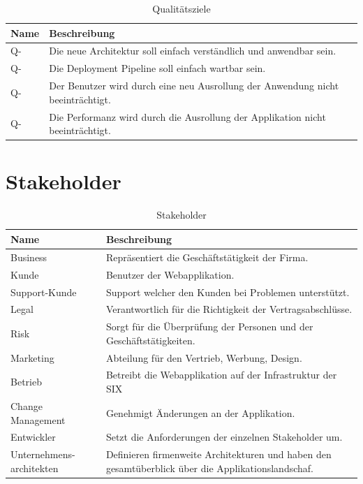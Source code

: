 \begin{table}[H]
	\centering
	\caption{Qualitätsziele}
	\begin{tabular}{ | p{3cm} | p{13cm} | }
		\toprule
		{\textbf{Name}} & {\textbf{Beschreibung}} \\
		\midrule
		Q-\arabic{quatar} \stepcounter{quatar} & Die neue Architektur soll einfach verständlich und anwendbar sein.\\ \hline
		Q-\arabic{quatar} \stepcounter{quatar} & Die Deployment Pipeline soll einfach wartbar sein. \\ \hline
		Q-\arabic{quatar} \stepcounter{quatar} & Der Benutzer wird durch eine neu Ausrollung der Anwendung nicht beeinträchtigt. \\ \hline
		Q-\arabic{quatar} \stepcounter{quatar} & Die Performanz wird durch die Ausrollung der Applikation nicht beeinträchtigt.\\ 
		\bottomrule
	\end{tabular}
\end{table}

\section{Stakeholder}

\begin{table}[H]
	\centering
	\caption{Stakeholder}
	\begin{tabular}{ | p{3cm} | p{13cm} | }
		\toprule
		{\textbf{Name}} & {\textbf{Beschreibung}} \\
		\midrule
		Business & Repräsentiert die Geschäftstätigkeit der Firma.\\ \hline
		Kunde & Benutzer der Webapplikation. \\ \hline
		Support-Kunde & Support welcher den Kunden bei Problemen unterstützt. \\ \hline
		Legal &  Verantwortlich für die Richtigkeit der Vertragsabschlüsse. \\ \hline
		Risk & Sorgt für die Überprüfung der Personen und der Geschäftstätigkeiten. \\ \hline
		Marketing & Abteilung für den Vertrieb, Werbung, Design. \\ \hline
		Betrieb & Betreibt die Webapplikation auf der Infrastruktur der SIX \\ \hline
		Change Management & Genehmigt Änderungen an der Applikation. \\ \hline
		Entwickler & Setzt die Anforderungen der einzelnen Stakeholder um. \\  \hline
		Unternehmens-architekten & Definieren firmenweite Architekturen und haben den gesamtüberblick über die Applikationslandschaf.\\ 
		\bottomrule
	\end{tabular}
\end{table}
